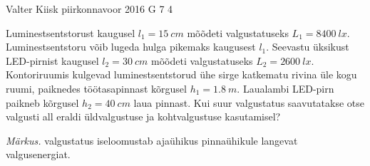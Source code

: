 \documentclass[11pt, twoside]{article}
\begin{document}
{%
{Valter Kiisk} %
{piirkonnavoor} %
{2016} %
{G 7} %
{4} %
{
\ifStatement
Luminestsentstorust kaugusel $l_1=\SI{15}{cm}$ mõõdeti valgustatuseks $L_1=\SI{8400}{lx}$. Luminestsentstoru võib lugeda hulga pikemaks kaugusest $l_1$. Seevastu üksikust LED-pirnist kaugusel $l_2=\SI{30}{cm}$ mõõdeti valgustatuseks $L_2=\SI{2600}{lx}$. Kontoriruumis kulgevad luminestsentstorud ühe sirge katkematu rivina üle kogu ruumi, paiknedes töötasapinnast kõrgusel $h_1=\SI{1.8}{m}$. Laualambi LED-pirn paikneb kõrgusel $h_2=\SI{40}{cm}$ laua pinnast. Kui suur valgustatus saavutatakse otse valgusti all eraldi üldvalgustuse ja kohtvalgustuse kasutamisel? 

\emph{Märkus.} valgustatus iseloomustab ajaühikus pinnaühikule langevat valgusenergiat.
\fi
}

}
\end{document}

